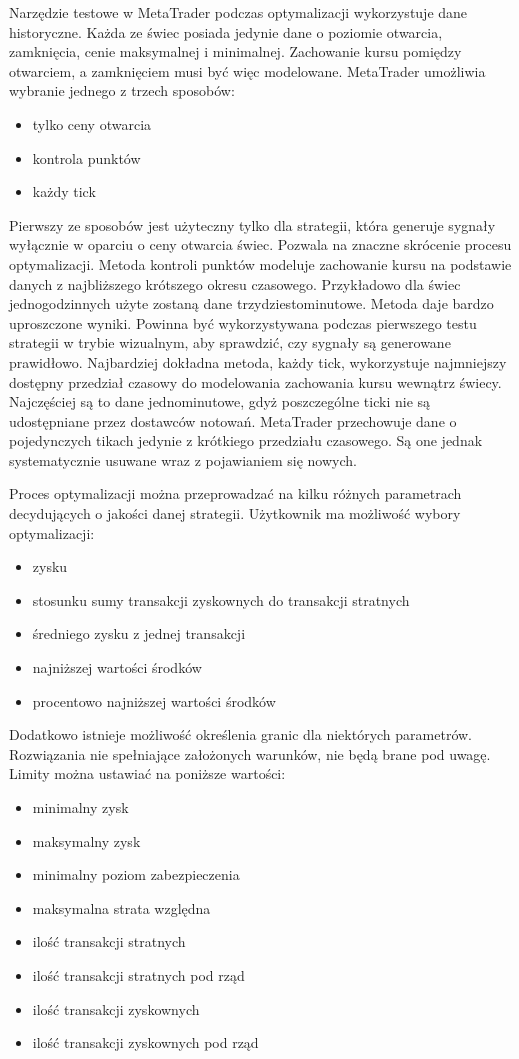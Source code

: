 \documentclass[pdflatex,11pt]{aghdpl}
\begin{document}
Narzędzie testowe w MetaTrader podczas optymalizacji wykorzystuje dane historyczne. Każda ze świec posiada jedynie dane o poziomie otwarcia, zamknięcia, cenie maksymalnej i minimalnej. Zachowanie kursu pomiędzy otwarciem, a zamknięciem musi być więc modelowane. MetaTrader umożliwia wybranie jednego z trzech sposobów:
\begin{itemize}
\item tylko ceny otwarcia
\item kontrola punktów
\item każdy tick
\end{itemize}
Pierwszy ze sposobów jest użyteczny tylko dla strategii, która generuje sygnały wyłącznie w oparciu o ceny otwarcia świec. Pozwala na znaczne skrócenie procesu optymalizacji. Metoda kontroli punktów modeluje zachowanie kursu na podstawie danych z najbliższego krótszego okresu czasowego. Przykładowo dla świec jednogodzinnych użyte zostaną dane trzydziestominutowe. Metoda daje bardzo uproszczone wyniki. Powinna być wykorzystywana podczas pierwszego testu strategii w trybie wizualnym, aby sprawdzić, czy sygnały są generowane prawidłowo. Najbardziej dokładna metoda, każdy tick, wykorzystuje najmniejszy dostępny przedział czasowy do modelowania zachowania kursu wewnątrz świecy. Najczęściej są to dane jednominutowe, gdyż poszczególne ticki nie są udostępniane przez dostawców notowań. MetaTrader przechowuje dane o pojedynczych tikach jedynie z krótkiego przedziału czasowego. Są one jednak systematycznie usuwane wraz z pojawianiem się nowych.

Proces optymalizacji można przeprowadzać na kilku różnych parametrach decydujących o jakości danej strategii. Użytkownik ma możliwość wybory optymalizacji:
\begin{itemize}
\item zysku
\item stosunku sumy transakcji zyskownych do transakcji stratnych
\item średniego zysku z jednej transakcji
\item najniższej wartości środków
\item procentowo najniższej wartości środków
\end{itemize}
Dodatkowo istnieje możliwość określenia granic dla niektórych parametrów. Rozwiązania nie spełniające założonych warunków, nie będą brane pod uwagę. Limity można ustawiać na poniższe wartości: 
\begin{itemize}
\item minimalny zysk
\item maksymalny zysk
\item minimalny poziom zabezpieczenia
\item maksymalna strata względna
\item ilość transakcji stratnych
\item ilość transakcji stratnych pod rząd
\item ilość transakcji zyskownych
\item ilość transakcji zyskownych pod rząd
\end{itemize}
\end{document}
